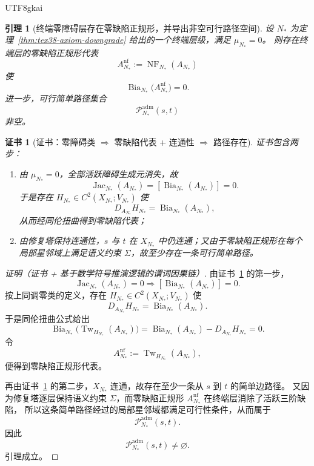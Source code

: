 \documentclass[12pt]{article}
\newtheorem{lemma}{引理}[section]
\newtheorem{Certificate}{证书}[section]
\newcommand{\NF}{\operatorname{NF}}
\newcommand{\Tw}{\operatorname{Tw}}
\newcommand{\Bia}{\operatorname{Bia}}
\newcommand{\Jac}{\operatorname{Jac}}
\begin{document}
\begin{CJK*}{UTF8}{gkai}
\begin{lemma}[终端零障碍层存在零缺陷正规形，并导出非空可行路径空间]
\label{lem:tex38-admissible-path}
设 $N_\ast$ 为定理~\ref{thm:tex38-axiom-downgrade} 给出的一个终端层级，满足 $\mu_{N_\ast}=0$。
则存在终端层的零缺陷正规形代表
\[
  A_{N_\ast}^{\mathrm{nf}}:=\NF_{N_\ast}(A_{N_\ast})
\]
使
\[
  \Bia_{N_\ast}\bigl(A_{N_\ast}^{\mathrm{nf}}\bigr)=0.
\]
进一步，可行简单路径集合
\[
  \mathcal{P}^{\mathrm{adm}}_{N_\ast}(s,t)
\]
非空。
\end{lemma}

\begin{Certificate}[证书：零障碍类 $\Rightarrow$ 零缺陷代表 + 连通性 $\Rightarrow$ 路径存在]
\label{cert:tex38-admissible-path}
证书包含两步：
\begin{enumerate}
  \item 由 $\mu_{N_\ast}=0$，全部活跃障碍生成元消失，故
  \[
    \Jac_{N_\ast}(A_{N_\ast})=[\Bia_{N_\ast}(A_{N_\ast})]=0.
  \]
  于是存在 $H_{N_\ast}\in C^2(X_{N_\ast};V_{N_\ast})$ 使
  \[
    D_{A_{N_\ast}}H_{N_\ast}=\Bia_{N_\ast}(A_{N_\ast}),
  \]
  从而经同伦扭曲得到零缺陷代表；
  \item 由修复塔保持连通性，$s$ 与 $t$ 在 $X_{N_\ast}$ 中仍连通；又由于零缺陷正规形在每个局部星邻域上满足语义约束 $\Sigma$，故至少存在一条可行简单路径。
\end{enumerate}
\end{Certificate}

\begin{proof}[证明（证书 + 基于数学符号推演逻辑的谓词因果链）]
由证书~\ref{cert:tex38-admissible-path} 的第一步，
\[
  \Jac_{N_\ast}(A_{N_\ast})=0
  \Longrightarrow
  [\Bia_{N_\ast}(A_{N_\ast})]=0.
\]
按上同调零类的定义，存在 $H_{N_\ast}\in C^2(X_{N_\ast};V_{N_\ast})$ 使
\[
  D_{A_{N_\ast}}H_{N_\ast}=\Bia_{N_\ast}(A_{N_\ast}).
\]
于是同伦扭曲公式给出
\[
  \Bia_{N_\ast}\bigl(\Tw_{H_{N_\ast}}(A_{N_\ast})\bigr)
  =
  \Bia_{N_\ast}(A_{N_\ast})-D_{A_{N_\ast}}H_{N_\ast}
  =
  0.
\]
令
\[
  A_{N_\ast}^{\mathrm{nf}}:=\Tw_{H_{N_\ast}}(A_{N_\ast}),
\]
便得到零缺陷正规形代表。

再由证书~\ref{cert:tex38-admissible-path} 的第二步，$X_{N_\ast}$ 连通，故存在至少一条从 $s$ 到 $t$ 的简单边路径。
又因为修复塔逐层保持语义约束 $\Sigma$，而零缺陷正规形 $A_{N_\ast}^{\mathrm{nf}}$ 在终端层消除了活跃三阶缺陷，
所以这条简单路径经过的局部星邻域都满足可行性条件，从而属于
\[
  \mathcal{P}^{\mathrm{adm}}_{N_\ast}(s,t).
\]
因此
\[
  \mathcal{P}^{\mathrm{adm}}_{N_\ast}(s,t)\neq\varnothing.
\]
引理成立。
\end{proof}


\end{CJK*}
\end{document}
